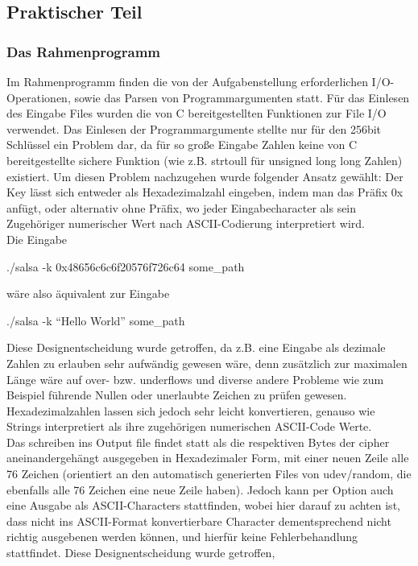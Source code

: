 \documentclass[course=erap]{aspdoc}
\begin{document}
\subsection{Praktischer Teil}
\subsubsection{Das Rahmenprogramm}
Im Rahmenprogramm finden die von der Aufgabenstellung erforderlichen I/O-Operationen, sowie das Parsen von Programmargumenten statt.
Für das Einlesen des Eingabe Files wurden die von C bereitgestellten Funktionen zur File I/O verwendet. Das Einlesen der Programmargumente stellte nur für den 256bit Schlüssel
ein Problem dar, da für so große Eingabe Zahlen keine von C bereitgestellte sichere Funktion (wie z.B. strtoull für unsigned long long Zahlen) existiert.
Um diesen Problem nachzugehen wurde folgender Ansatz gewählt:
Der Key lässt sich entweder als Hexadezimalzahl eingeben, indem man das Präfix 0x anfügt, oder alternativ ohne Präfix, wo jeder Eingabecharacter als sein Zugehöriger numerischer Wert
nach ASCII-Codierung interpretiert wird.
\\Die Eingabe 
\begin{center}
    ./salsa -k 0x48656c6c6f20576f726c64  some\_path 
\end{center} 
wäre also äquivalent zur Eingabe
\begin{center}
    ./salsa -k ``Hello World'' some\_path
\end{center}
Diese Designentscheidung wurde getroffen, da z.B. eine Eingabe als dezimale Zahlen zu erlauben sehr aufwändig gewesen wäre, denn zusätzlich zur maximalen Länge wäre auf over- bzw. underflows und diverse andere Probleme wie zum
Beispiel führende Nullen oder unerlaubte Zeichen zu prüfen gewesen. Hexadezimalzahlen lassen sich jedoch sehr leicht konvertieren, genauso wie Strings interpretiert als ihre zugehörigen numerischen ASCII-Code Werte.
\\Das schreiben ins Output file findet statt als die respektiven Bytes der cipher aneinandergehängt ausgegeben in Hexadezimaler Form, mit einer neuen Zeile alle 76 Zeichen (orientiert an den automatisch generierten Files von udev/random, die ebenfalls alle 76 Zeichen eine neue Zeile haben).
Jedoch kann per Option auch eine Ausgabe als ASCII-Characters stattfinden, wobei hier darauf zu achten ist, dass nicht ins ASCII-Format konvertierbare Character dementsprechend nicht richtig ausgebenen werden können, und hierfür keine Fehlerbehandlung stattfindet. Diese Designentscheidung wurde getroffen, 
\end{document}
